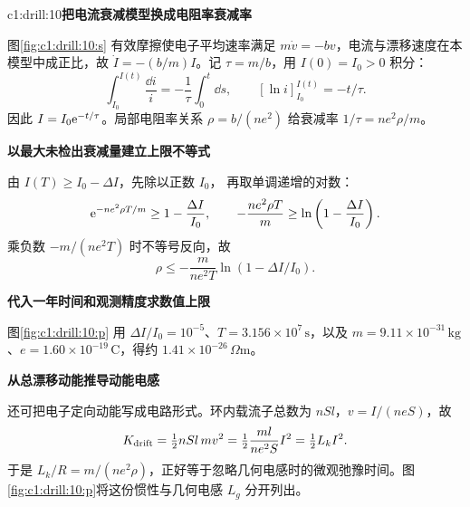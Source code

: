 \begin{drillsolution}{c1:drill:10}\textbf{把电流衰减模型换成电阻率衰减率}\par\nobreak
图\ref{fig:c1:drill:10:s} 有效摩擦使电子平均速率满足 $m\dot v=-bv$，电流与漂移速度在本模型中成正比，故
$\dot I=-(b/m)I$。记 $\tau=m/b$，用 $I(0)=I_0>0$ 积分：
\[
 \int_{I_0}^{I(t)}\frac{\dd i}{i}=-\frac1\tau\int_0^t\dd s,
 \qquad [\ln i]_{I_0}^{I(t)}=-t/\tau.
\]
因此 $I=I_0\mathrm e^{-t/\tau}$。局部电阻率关系 $\rho=b/(ne^2)$ 给衰减率 $1/\tau=ne^2\rho/m$。

\par\medskip{}\noindent\textbf{以最大未检出衰减量建立上限不等式}\par\nobreak
由 $I(T)\ge I_0-\Delta I$，先除以正数 $I_0$，
再取单调递增的对数：
\[
 \mathrm e^{-ne^2\rho T/m}\ge1-\frac{\Delta I}{I_0},
 \qquad -\frac{ne^2\rho T}{m}
 \ge\ln\left(1-\frac{\Delta I}{I_0}\right).
\]
乘负数 $-m/(ne^2T)$ 时不等号反向，故
\[
 \rho\le-\frac{m}{ne^2T}\ln(1-\Delta I/I_0).
\]



\par\medskip{}\noindent\textbf{代入一年时间和观测精度求数值上限}\par\nobreak
图\ref{fig:c1:drill:10:p} 用 $\Delta I/I_0=10^{-5}$、$T=3.156\times10^7\,\mathrm s$，以及 $m=9.11\times10^{-31}\,\mathrm{kg}$、$e=1.60\times10^{-19}\,\mathrm C$，得约 $1.41\times10^{-26}\,\Omega\mathrm m$。



\par\medskip{}\noindent\textbf{从总漂移动能推导动能电感}\par\nobreak
还可把电子定向动能写成电路形式。环内载流子总数为 $nSl$，$v=I/(neS)$，故
\[
 K_{\rm drift}=\tfrac12nSl\,mv^2
 =\tfrac12\frac{ml}{ne^2S}I^2=\tfrac12L_kI^2.
\]
于是 $L_k/R=m/(ne^2\rho)$，正好等于忽略几何电感时的微观弛豫时间。图\ref{fig:c1:drill:10:p}将这份惯性与几何电感 $L_g$ 分开列出。




\end{drillsolution}
